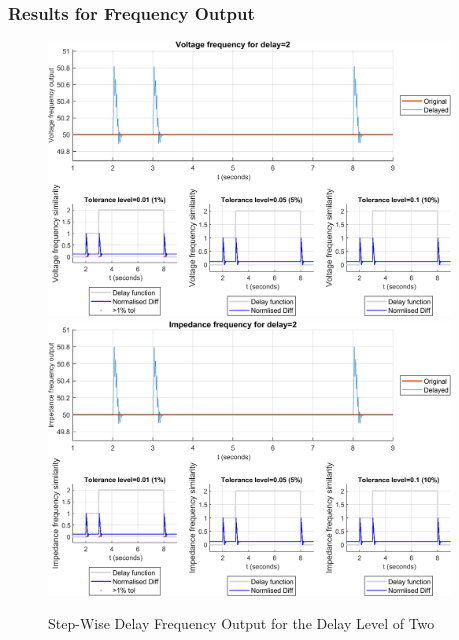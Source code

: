 \subsubsection{Results for Frequency Output}


\begin{figure}
    \caption{Step-Wise Delay Frequency Output for the Delay Level of Two}
    \includegraphics[width=0.95\textwidth]{PMUsim-figures/DelayOf_2/Step_vFrequency.png}    
    \label{fig:PMUsimStep_Two_vFrequency}
    \includegraphics[width=0.95\textwidth]{PMUsim-figures/DelayOf_2/Step_iFrequency.png}    
    \label{fig:PMUsimStep_Two_Frequency}
        \begin{small}
     \end{small}
\end{figure}


